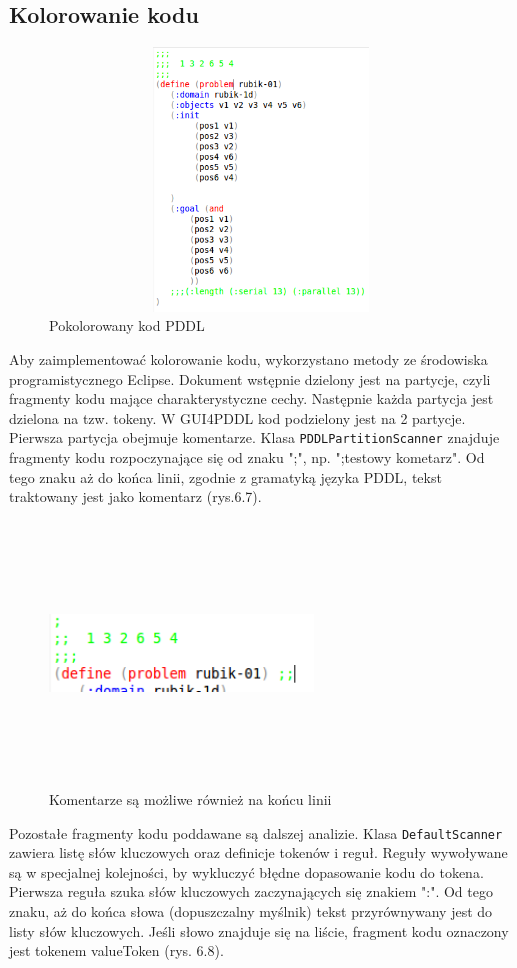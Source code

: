 \subsection{Kolorowanie kodu}
\begin{figure}[h]
  \centering
    \includegraphics[width=13cm,height=7cm,keepaspectratio]{img/colored-code.png}
    \caption{Pokolorowany kod PDDL}
    \label{ana_structure}
\end{figure}
Aby zaimplementować kolorowanie kodu, wykorzystano metody ze środowiska programistycznego Eclipse. Dokument wstępnie dzielony jest na partycje, czyli fragmenty kodu mające charakterystyczne cechy. Następnie każda partycja jest dzielona na tzw. tokeny. W GUI4PDDL kod podzielony jest na 2 partycje. Pierwsza partycja obejmuje komentarze. Klasa \texttt{PDDLPartitionScanner} znajduje fragmenty kodu rozpoczynające się od znaku ";", np.  ";testowy kometarz". Od tego znaku aż do końca linii, zgodnie z gramatyką języka PDDL, tekst traktowany jest jako komentarz (rys.6.7).
\begin{figure}[h]
  \centering
    \includegraphics[width=7cm,height=7cm,keepaspectratio]{img/comments.png}
    \caption{Komentarze są możliwe również na końcu linii}
    \label{ana_structure}
\end{figure}
Pozostałe fragmenty kodu poddawane są dalszej analizie. Klasa \texttt{DefaultScanner} zawiera listę słów kluczowych oraz definicje tokenów i reguł. Reguły wywoływane są w specjalnej kolejności, by wykluczyć błędne dopasowanie kodu do tokena. Pierwsza reguła szuka słów kluczowych zaczynających się znakiem ":".  Od tego znaku, aż do końca słowa (dopuszczalny myślnik) tekst przyrównywany jest do listy słów kluczowych. Jeśli słowo znajduje się na liście, fragment kodu oznaczony jest tokenem valueToken (rys. 6.8).

